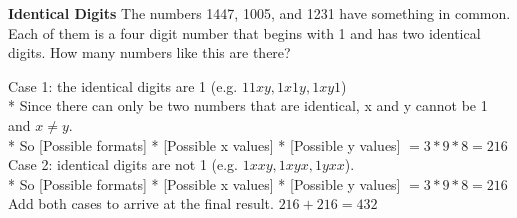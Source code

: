 \question \textbf{Identical Digits}
The numbers 1447, 1005, and 1231 have something in common. Each of them 
is a four digit number that begins with 1 and has two identical digits. 
How many numbers like this are there?
\begin{solution}[0.5 in]
Case 1: the identical digits are 1 (e.g. $11xy, 1x1y, 1xy1$) \\*
Since there can only be two numbers that are identical, x and y cannot 
be 1 and $x \neq y$. \\*
So [Possible formats] * [Possible x values] * [Possible y values] $= 
3 * 9 * 8 = 216$ \\
Case 2: identical digits are not 1 (e.g. $1xxy, 1xyx, 1yxx$). \\* So 
[Possible formats] * [Possible x values] * [Possible y values] 
$= 3 * 9 * 8 = 216$ \\
Add both cases to arrive at the final result. $216 + 216 = 432$
\end{solution}